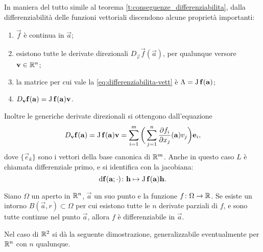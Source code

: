 In maniera del tutto simile al teorema \ref{t:conseguenze_differenziabilita}, dalla differenziabilità delle funzioni vettoriali discendono alcune proprietà importanti:
\begin{enumerate}
\item $\vec f$ è continua in $\vec a$;
\item esistono tutte le derivate direzionali $D_{\vec v}\vec f(\vec a)$, per qualunque versore $\mathbf{v}\in\mathbb{R}^n$;
\item la matrice per cui vale la \eqref{eq:differenziabilita-vett} è $\Lambda=\operatorname{J}\mathbf{f}(\mathbf{a})$;
\item $D_{\mathbf{v}}\mathbf{f}(\mathbf{a})=\operatorname{J}\mathbf{f}(\mathbf{a})\mathbf{v}$.
\end{enumerate}
Inoltre le generiche derivate direzionali si ottengono dall'equazione
\[
D_{\mathbf{v}}\mathbf{f}(\mathbf{a})=\operatorname{J}\mathbf{f}(\mathbf{a})\mathbf{v}=\sum_{i=1}^m\bigg(\sum_{j=1}^n\frac{\partial {f_i}}{\partial {x_j}}(\mathbf{a})v_j\bigg)\mathbf{e}_i,
\]
dove $\{\vec e_k\}$ sono i vettori della base canonica di $\mathbb{R}^m$.
Anche in questo caso $L$ è chiamata differenziale primo, e si identifica con la jacobiana:
\[
\textup{d}\mathbf{f}(\mathbf{a};\cdot)\colon\mathbf{h}\mapsto\operatorname{J}\mathbf{f}(\mathbf{a})\mathbf{h}.
\]
\begin{teorema}
Siano $\Omega$ un aperto in $\mathbb{R}^n$, $\vec a$ un suo punto e la funzione $f\colon\Omega\to\mathbb{R}$. Se esiste un intorno $B(\vec a,r)\subset\Omega$ per cui esistono tutte le $n$ derivate parziali di $f$, e sono tutte continue nel punto $\vec a$, allora $f$ è differenziabile in $\vec a$.
\end{teorema}
Nel caso di $\mathbb{R}^2$ si dà la seguente dimostrazione, generalizzabile eventualmente per $\mathbb{R}^n$ con $n$ qualunque.
